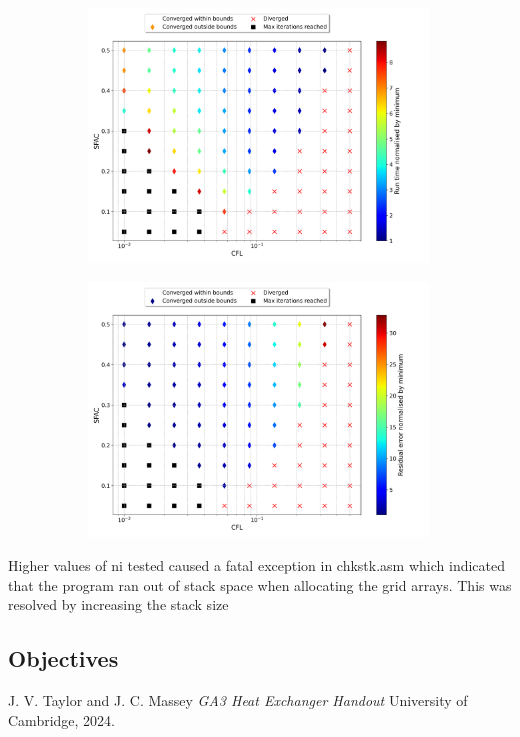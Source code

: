 \documentclass{article}
\begin{document}
\begin{figure}
    \centering
    \begin{subfigure}{0.49\textwidth}
        \centering
        \includegraphics[width=0.99\textwidth]{figures/bump_cfl_sfac_time.png}
        \caption{}
        \label{fig:bump_time}
    \end{subfigure}
    \begin{subfigure}{0.49\textwidth}
        \centering
        \includegraphics[width=0.99\textwidth]{figures/bump_cfl_sfac_residual.png}
        \caption{}
        \label{fig:bump_residual}
    \end{subfigure}
\end{figure}

Higher values of ni tested caused a fatal exception in chkstk.asm which indicated that the program ran out of stack space when allocating the grid arrays.
This was resolved by increasing the stack size 

\subsection{Objectives}


\begin{thebibliography}{9}

  J. V. Taylor and J. C. Massey
  \emph{GA3 Heat Exchanger Handout}
  University of Cambridge,
  2024.

\end{thebibliography}
\end{document}
